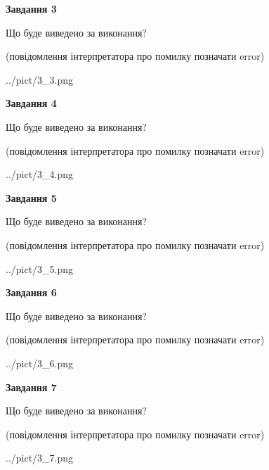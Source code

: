 \documentclass[12pt, ukrainian]{article}
\begin{document}
{\begin {large}
{\begin {center}\textbf{Завдання 3}\end {center}}\par
Що буде виведено за виконання?\par
 (повідомлення інтерпретатора про помилку позначати error)\par
\begin{center}
	{../pict/3_3.png}
\end{center}
\newpage

{\begin {center}\textbf{Завдання 4}\end {center}}\par
Що буде виведено за виконання?\par
 (повідомлення інтерпретатора про помилку позначати error)\par
\begin{center}
	{../pict/3_4.png}
\end{center}
\newpage

{\begin {center}\textbf{Завдання 5}\end {center}}\par
Що буде виведено за виконання?\par
 (повідомлення інтерпретатора про помилку позначати error)\par
\begin{center}
	{../pict/3_5.png}
\end{center}
\newpage

{\begin {center}\textbf{Завдання 6}\end {center}}\par
Що буде виведено за виконання?\par
 (повідомлення інтерпретатора про помилку позначати error)\par
\begin{center}
	{../pict/3_6.png}
\end{center}
\newpage

{\begin {center}\textbf{Завдання 7}\end {center}}\par
Що буде виведено за виконання?\par
 (повідомлення інтерпретатора про помилку позначати error)\par
\begin{center}
	{../pict/3_7.png}
\end{center}
\newpage


\end{large}}
\end{document}
